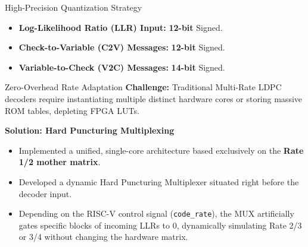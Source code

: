 \documentclass[t, aspectratio=169]{beamer}
\begin{document}
	\begin{frame}{High-Precision Quantization Strategy}
        \vspace{0.5em}
		\begin{itemize}
			\item \textbf{Log-Likelihood Ratio (LLR) Input:} \textbf{12-bit} Signed.
			\item \textbf{Check-to-Variable (C2V) Messages:} \textbf{12-bit} Signed.
			\item \textbf{Variable-to-Check (V2C) Messages:} \textbf{14-bit} Signed.
		\end{itemize}

        \vspace{1em}

	\end{frame}

	\begin{frame}{Zero-Overhead Rate Adaptation}
		\textbf{Challenge:} Traditional Multi-Rate LDPC decoders require instantiating multiple distinct hardware cores or storing massive ROM tables, depleting FPGA LUTs.
		
		\vspace{1em}
		\textbf{Solution: Hard Puncturing Multiplexing}
		\begin{itemize}
			\item Implemented a unified, single-core architecture based exclusively on the \textbf{Rate 1/2 mother matrix}.
			\item Developed a dynamic Hard Puncturing Multiplexer situated right before the decoder input.
			\item Depending on the RISC-V control signal (\texttt{code\_rate}), the MUX artificially gates specific blocks of incoming LLRs to 0, dynamically simulating Rate 2/3 or 3/4 without changing the hardware matrix.
		\end{itemize}
	\end{frame}
\end{document}
